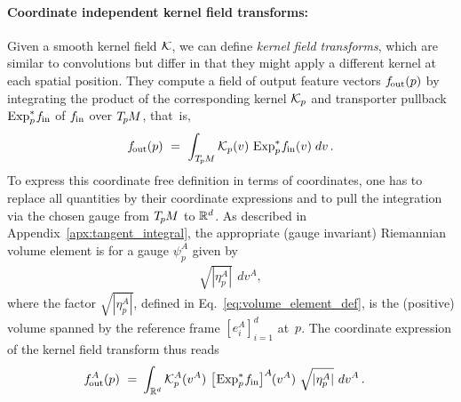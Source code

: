 \paragraph{Coordinate independent kernel field transforms:}
Given a smooth kernel field $\mathcal{K}$, we can define \emph{kernel field transforms}, which are similar to convolutions but differ in that they might apply a different kernel at each spatial position.
They compute a field of output feature vectors $f_\textup{\:\!\!out}(p)$ by
integrating the product of the corresponding kernel $\mathcal{K}_p$ and transporter pullback $\operatorname{Exp}^*_p\mkern-2mu f_\textup{\;\!\!in}$ of $f_\textup{\;\!\!in}$ over $T_{\mkern-1.5mu p}\mkern-.5muM$, that~is,
\begin{align}\label{eq:kft_coord_free}
    \fout(p)\ =\ 
    \int_{\TpM}
    \Kp(v) \,
    \Expspfin(v) \;
    dv \,.
\end{align}
To express this coordinate free definition in terms of coordinates, one has to replace all quantities by their coordinate expressions and to pull the integration via the chosen gauge from $T_{\mkern-1.5mu p}\mkern-.5muM$ to $\mathbb{R}^d$.
As described in Appendix~\ref{apx:tangent_integral}, the appropriate (gauge invariant) Riemannian volume element is for a gauge $\psi_p^A$ given by
\begin{align}
    \sqrt{|\eta_p^A|} \,\ dv^A ,
\end{align}
where the factor $\sqrt{|\eta_p^A|}$, defined in Eq.~\eqref{eq:volume_element_def}, is the (positive) volume spanned by the reference frame $[e_i^A]_{i=1}^d$ at~$p$.
The coordinate expression of the kernel field transform thus reads
\begin{align}\label{eq:kft_coord_expression}
    \fout^A(p)
    \ =&\ 
        \int_{\R^d}
        \Kp^A(v^A) \ 
        \big[\mkern-2mu \Expspfin\big]^A \mkern-1mu(v^A) \ 
        \sqrt{|\eta_p^A|}\ dv^A
    \,.
\end{align}

